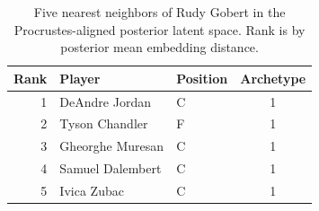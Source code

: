 \begin{table}[htbp]
  \centering\small
  \begin{tabular}{rllc}
    \toprule
    Rank & Player & Position & Archetype \\
    \midrule
    1 & DeAndre Jordan & C & 1 \\
    2 & Tyson Chandler & F & 1 \\
    3 & Gheorghe Muresan & C & 1 \\
    4 & Samuel Dalembert & C & 1 \\
    5 & Ivica Zubac & C & 1 \\
    \bottomrule
  \end{tabular}
  \caption{Five nearest neighbors of Rudy Gobert in the Procrustes-aligned posterior latent space. Rank is by posterior mean embedding distance.}
  \label{tab:Rudy_Gobert_neighbors}
\end{table}

